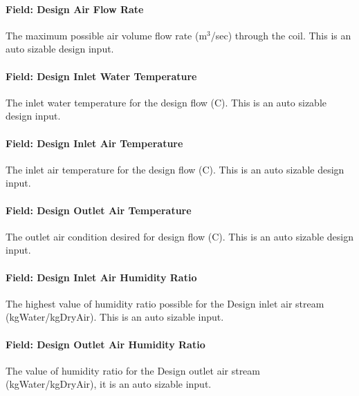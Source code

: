 \paragraph{Field: Design Air Flow Rate}\label{field-design-air-flow-rate-000}

The maximum possible air volume flow rate (m\(^{3}\)/sec) through the coil. This is an auto sizable design input.

\paragraph{Field: Design Inlet Water Temperature}\label{field-design-inlet-water-temperature-000}

The inlet water temperature for the design flow (C). This is an auto sizable design input.

\paragraph{Field: Design Inlet Air Temperature}\label{field-design-inlet-air-temperature}

The inlet air temperature for the design flow (C). This is an auto sizable design input.

\paragraph{Field: Design Outlet Air Temperature}\label{field-design-outlet-air-temperature}

The outlet air condition desired for design flow (C). This is an auto sizable design input.

\paragraph{Field: Design Inlet Air Humidity Ratio}\label{field-design-inlet-air-humidity-ratio}

The highest value of humidity ratio possible for the Design inlet air stream (kgWater/kgDryAir). This is an auto sizable input.

\paragraph{Field: Design Outlet Air Humidity Ratio}\label{field-design-outlet-air-humidity-ratio}

The value of humidity ratio for the Design outlet air stream (kgWater/kgDryAir), it is an auto sizable input.

